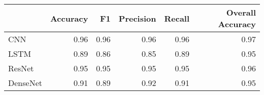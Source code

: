 \begin{tabular}{lrrrrr}
\toprule
{} &  Accuracy &    F1 &  Precision &  Recall &  Overall Accuracy \\
\midrule
CNN      &      0.96 &  0.96 &       0.96 &    0.96 &              0.97 \\
LSTM     &      0.89 &  0.86 &       0.85 &    0.89 &              0.95 \\
ResNet   &      0.95 &  0.95 &       0.95 &    0.95 &              0.96 \\
DenseNet &      0.91 &  0.89 &       0.92 &    0.91 &              0.95 \\
\bottomrule
\end{tabular}
